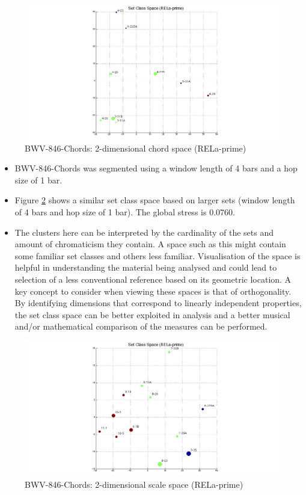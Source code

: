 \documentclass{article}
\begin{document}
\begin{figure}[htb]
\centering
\includegraphics[width=.8\linewidth]{./plots/scspace1.png}
\caption{\label{fig:scspace1}BWV-846-Chords: 2-dimensional chord space (RELa-prime)}
\end{figure}
\begin{itemize}
\item BWV-846-Chords was segmented using a window length of 4 bars and a
  hop size of 1 bar.
\item Figure \ref{fig:scspace2} shows a similar set class space based on
  larger sets (window length of 4 bars and hop size of 1 bar). The
  global stress is 0.0760.
\item The clusters here can be interpreted by the cardinality of the sets
  and amount of chromaticism they contain. A space such as this might
  contain some familiar set classes and others less
  familiar. Visualisation of the space is helpful in understanding the
  material being analysed and could lead to selection of a less
  conventional reference based on its geometric location. A key
  concept to consider when viewing these spaces is that of
  orthogonality. By identifying dimensions that correspond to linearly
  independent properties, the set class space can be better exploited
  in analysis and a better musical and/or mathematical comparison of
  the measures can be performed.
\end{itemize}
\begin{figure}[htb]
\centering
\includegraphics[width=.8\linewidth]{./plots/scspace2.png}
\caption{\label{fig:scspace2}BWV-846-Chords: 2-dimensional scale space (RELa-prime)}
\end{figure}
\end{document}
